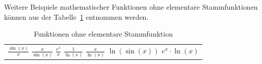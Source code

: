 \noindent
Weitere Beispiele mathematischer Funktionen ohne elementare Stammfunktionen können aus 
der Tabelle~\ref{buch:table:funktionenohnestammfunktion} entnommen werden.

\begin{table}[h!]
    \begin{tabular}{|c|}
        \hline
        $\displaystyle \frac{\sin(x)}{x}$
        $\displaystyle \frac{x}{\sin(x)}$
        $\displaystyle \frac{e^{x}}{x}$
        $\displaystyle \frac{1}{\operatorname{ln}(x)}$
        $\displaystyle \frac{x}{\operatorname{ln}(x)}$
        $\displaystyle \operatorname{ln}(\sin(x))$
        $\displaystyle e^{x}\cdot\operatorname{ln}(x)$
        \hline
    \end{tabular}
    
    \caption{Funktionen ohne elementare Stammfunktion
    \label{buch:table:funktionenohnestammfunktion}}  
\end{table}